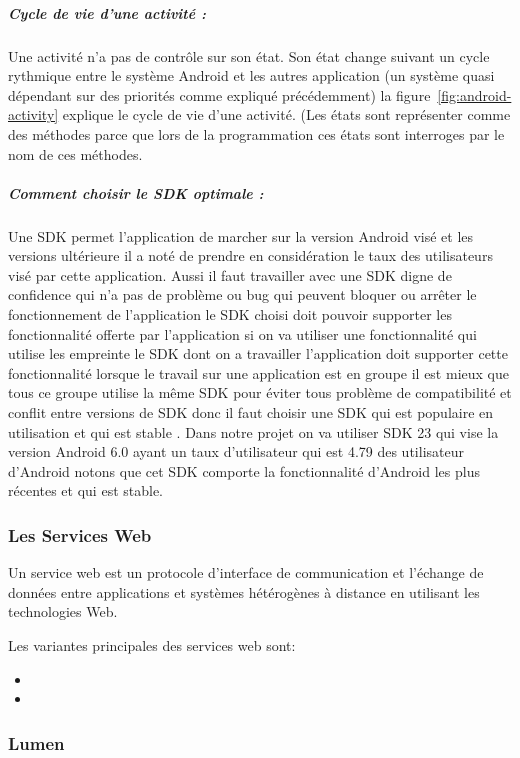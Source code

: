 \subparagraph{Cycle de vie d'une activité :}
Une activité n'a pas de contrôle sur son état.
Son état change suivant un cycle rythmique entre le système Android et les
autres application (un système quasi dépendant sur des priorités comme expliqué
précédemment) la figure~\ref{fig:android-activity} explique le cycle de vie
d'une activité. (Les états sont représenter comme des méthodes parce que lors de
la programmation ces états sont interroges par le nom de ces méthodes.


\subparagraph{Comment choisir le SDK optimale :}
Une SDK permet l'application de marcher sur la version Android visé
et les versions ultérieure il  a noté de prendre en considération le taux des
utilisateurs visé par cette application. Aussi il faut travailler avec une SDK
digne de confidence qui n'a pas de problème ou bug qui peuvent  bloquer ou arrêter
le fonctionnement de l'application le SDK choisi doit pouvoir supporter les
fonctionnalité offerte par l'application si on va utiliser une fonctionnalité
qui utilise les empreinte le SDK dont on a travailler l'application doit supporter
cette fonctionnalité lorsque le travail sur une application est en groupe il est
mieux que tous ce groupe utilise la même SDK pour éviter tous problème de
compatibilité et conflit entre versions de SDK  donc il faut choisir une SDK
qui est populaire en utilisation et qui est stable . Dans notre projet on va
utiliser SDK 23 qui vise la version Android 6.0 ayant un taux d'utilisateur
qui est 4.79 %
des utilisateur d'Android notons que cet SDK comporte
la fonctionnalité d'Android les plus récentes et qui est stable.

\subsubsection{Les Services Web}

Un service web est un protocole d'interface de communication et l'échange de
données entre applications et systèmes hétérogènes à distance en utilisant les
technologies Web.

Les variantes principales des services web sont:
\begin{itemize}
        \item {}
        \item {}
\end{itemize}

\subsubsection{Lumen}

